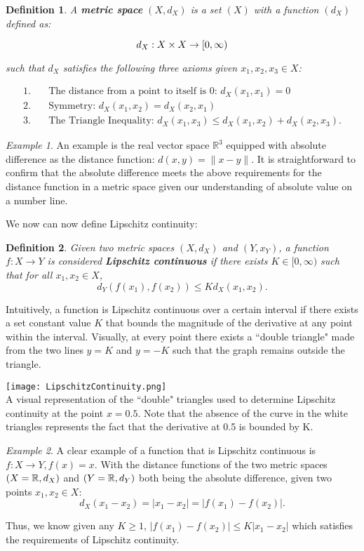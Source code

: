 \documentclass{article}
\newtheorem{definition}{Definition}
\theoremstyle{remark}
\newtheorem{example}{Example}
\begin{document}
\begin{definition}
 A \textbf{metric space} $(X, d_X)$ is a set $(X)$ with a function $(d_X)$ defined as:

$$d_X: X \times X \to \Bbb [0, \infty )$$

such that $d_X$ satisfies the following three axioms given $x_1, x_2, x_3 \in X$:

\end{definition}
\begin{align*}
1.& \quad \text{The distance from a point to itself is 0: }d_X(x_1, x_1) = 0 \\ 
2.& \quad \text{Symmetry: } d_X(x_1, x_2) = d_X(x_2, x_1)\\
3.& \quad \text{The Triangle Inequality: }d_X(x_1, x_3) \leq  d_X(x_1, x_2) + d_X(x_2, x_3).
\end{align*}
\begin{example}
An example is the real vector space $\mathbb{R}^3$ equipped with absolute difference as the distance function: $d(x,y) = \|x-y\|$. It is straightforward to confirm that the absolute difference meets the above requirements for the distance function in a metric space given our understanding of absolute value on a number line.
\end{example}


We now can now define Lipschitz continuity: \\ 

\begin{definition} 
Given two metric spaces $(X, d_X)$ and $(Y, x_Y)$, a function $f: X \to Y$ is considered \textbf{Lipschitz continuous} if there exists $K \in [0, \infty)$ such that for all $x_1, x_2 \in X$,
$$d_Y(f(x_1),f(x_2)) \leq Kd_X(x_1,x_2).$$
\end{definition} 

Intuitively, a function is Lipschitz continuous over a certain interval if there exists a set constant value $K$ that bounds the magnitude of the derivative at any point within the interval. Visually, at every point there exists a ``double triangle" made from the two lines $y = K$ and $y = -K$ such that  the graph remains outside the triangle.\\

\begin{center}\texttt{[image: LipschitzContinuity.png]} \\ A visual representation of the ``double" triangles used to determine Lipschitz continuity at the point $x = 0.5$. Note that the absence of the curve in the white triangles represents the fact that the derivative at 0.5 is bounded by K. \end{center}
\begin{example}
A clear example of a function that is Lipschitz continuous is $f: X \to Y, f(x) = x$. With the distance functions of the two metric spaces $(X = \Bbb R, d_X)$ and $(Y = \Bbb R, d_Y)$ both being the absolute difference, given two points $x_1, x_2 \in X$:
$$d_X(x_1 - x_2) = |x_1 - x_2| = |f(x_1) - f(x_2)|.$$

Thus, we know given any $K \geq 1$, $ |f(x_1) - f(x_2)| \leq K|x_1 - x_2|$ which satisfies the requirements of Lipschitz continuity.
\end{example}
\end{document}
